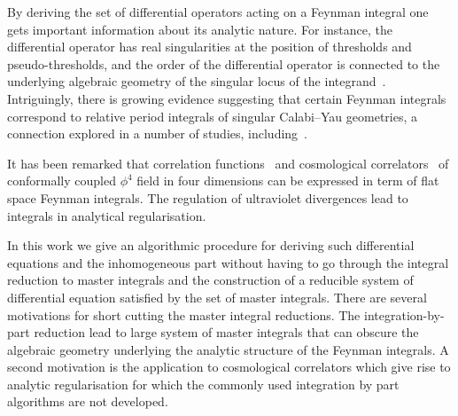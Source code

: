 \documentclass[a4paper,12pt]{article}
\numberwithin{equation}{section}
\numberwithin{figure}{section}
\begin{document}
\medskip
By deriving the set of differential operators acting on a Feynman integral one
gets important information about its analytic nature. For instance, 
the differential  operator has real singularities at the position of
 thresholds and pseudo-thresholds, and the order of the differential
operator is connected to the underlying algebraic geometry of the singular locus
of the integrand~\cite{Doran:2023yzu}. Intriguingly, there is  growing evidence suggesting that certain
Feynman integrals correspond to relative period integrals of singular
Calabi--Yau geometries, a connection explored in a number
of studies,
including~\cite{Brown:2009ta,Bloch:2014qca,Bloch:2016izu,Bourjaily:2018ycu,Bourjaily:2019hmc,Bourjaily:2018yfy,Klemm:2019dbm,Bonisch:2020qmm,Bonisch:2021yfw,Bourjaily:2022bwx,Forum:2022lpz,Duhr:2022pch,Frellesvig:2023PM}.

It has been remarked that correlation
functions~\cite{Heckelbacher:2022hbq}
and cosmological correlators~\cite{Heckelbacher:2022fbx,Chowdhury:2023arc}
of conformally
coupled $\phi^4$ field in four dimensions can be expressed in term of
flat space Feynman integrals.  The regulation of ultraviolet
divergences lead to integrals in analytical regularisation.

In this work we give an algorithmic procedure for deriving such
differential equations and the inhomogeneous part without having to go through the integral
reduction to master integrals and the construction of a reducible
system of differential equation satisfied by the set of master
integrals.  There are several motivations for short cutting the master
integral reductions. The integration-by-part reduction lead to large
system of master integrals that can obscure the algebraic
geometry underlying the analytic
structure of the Feynman integrals.
A second motivation is the application to
cosmological correlators which give rise to analytic regularisation
for which the commonly used integration by part algorithms are not  developed. 
\end{document}
